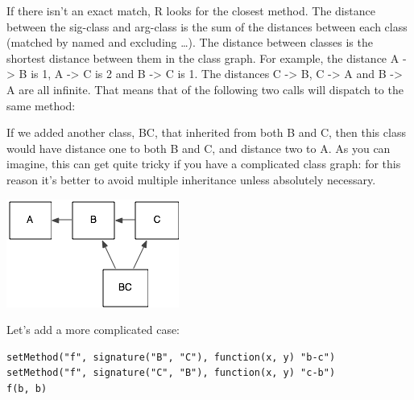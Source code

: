 If there isn't an exact match, R looks for the closest method. The
distance between the sig-class and arg-class is the sum of the distances
between each class (matched by named and excluding \ldots{}). The
distance between classes is the shortest distance between them in the
class graph. For example, the distance A -\textgreater{} B is 1, A
-\textgreater{} C is 2 and B -\textgreater{} C is 1. The distances C
-\textgreater{} B, C -\textgreater{} A and B -\textgreater{} A are all
infinite. That means that of the following two calls will dispatch to
the same method:

\begin{Shaded}
\begin{Highlighting}[]
\end{Highlighting}
\end{Shaded}

If we added another class, BC, that inherited from both B and C, then
this class would have distance one to both B and C, and distance two to
A. As you can imagine, this can get quite tricky if you have a
complicated class graph: for this reason it's better to avoid multiple
inheritance unless absolutely necessary.

\includegraphics{diagrams/class-graph-2.png}

\begin{Shaded}
\begin{Highlighting}[]
\NormalTok{(}\NormalTok{, } \NormalTok{(}\NormalTok{, }\NormalTok{))}
\StringTok{ }\NormalTok{(}\NormalTok{, }\NormalTok{)}
\end{Highlighting}
\end{Shaded}

Let's add a more complicated case:

\begin{verbatim}
setMethod("f", signature("B", "C"), function(x, y) "b-c")
setMethod("f", signature("C", "B"), function(x, y) "c-b")
f(b, b)
\end{verbatim}

